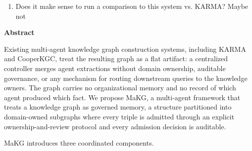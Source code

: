 \begin{enumerate}
  \begin{enumerate}
  \def\labelenumii{\alph{enumii}.}
  \item
    Does it make sense to run a comparison to this system vs. KARMA?
    Maybe not
  \end{enumerate}
\end{enumerate}

\textbf{Abstract}

Existing multi-agent knowledge graph construction systems, including
KARMA and CooperKGC, treat the resulting graph as a flat artifact: a
centralized controller merges agent extractions without domain
ownership, auditable governance, or any mechanism for routing downstream
queries to the knowledge owners. The graph carries no organizational
memory and no record of which agent produced which fact. We propose
MaKG, a multi-agent framework that treats a knowledge graph as governed
memory, a structure partitioned into domain-owned subgraphs where every
triple is admitted through an explicit ownership-and-review protocol and
every admission decision is auditable.

MaKG introduces three coordinated components.

